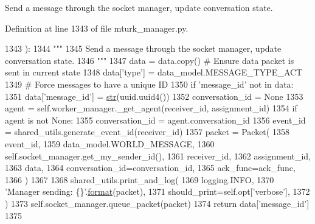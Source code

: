 \begin{DoxyVerb}Send a message through the socket manager, update conversation state.
\end{DoxyVerb}
 

Definition at line 1343 of file mturk\+\_\+manager.\+py.


\begin{DoxyCode}
1343     ):
1344         \textcolor{stringliteral}{"""}
1345 \textcolor{stringliteral}{        Send a message through the socket manager, update conversation state.}
1346 \textcolor{stringliteral}{        """}
1347         data = data.copy()  \textcolor{comment}{# Ensure data packet is sent in current state}
1348         data[\textcolor{stringliteral}{'type'}] = data\_model.MESSAGE\_TYPE\_ACT
1349         \textcolor{comment}{# Force messages to have a unique ID}
1350         \textcolor{keywordflow}{if} \textcolor{stringliteral}{'message\_id'} \textcolor{keywordflow}{not} \textcolor{keywordflow}{in} data:
1351             data[\textcolor{stringliteral}{'message\_id'}] = \hyperlink{namespacegenerate__task__READMEs_a5b88452ffb87b78c8c85ececebafc09f}{str}(uuid.uuid4())
1352         conversation\_id = \textcolor{keywordtype}{None}
1353         agent = self.worker\_manager.\_get\_agent(receiver\_id, assignment\_id)
1354         \textcolor{keywordflow}{if} agent \textcolor{keywordflow}{is} \textcolor{keywordflow}{not} \textcolor{keywordtype}{None}:
1355             conversation\_id = agent.conversation\_id
1356         event\_id = shared\_utils.generate\_event\_id(receiver\_id)
1357         packet = Packet(
1358             event\_id,
1359             data\_model.WORLD\_MESSAGE,
1360             self.socket\_manager.get\_my\_sender\_id(),
1361             receiver\_id,
1362             assignment\_id,
1363             data,
1364             conversation\_id=conversation\_id,
1365             ack\_func=ack\_func,
1366         )
1367 
1368         shared\_utils.print\_and\_log(
1369             logging.INFO,
1370             \textcolor{stringliteral}{'Manager sending: \{\}'}.\hyperlink{namespaceparlai_1_1chat__service_1_1services_1_1messenger_1_1shared__utils_a32e2e2022b824fbaf80c747160b52a76}{format}(packet),
1371             should\_print=self.opt[\textcolor{stringliteral}{'verbose'}],
1372         )
1373         self.socket\_manager.queue\_packet(packet)
1374         \textcolor{keywordflow}{return} data[\textcolor{stringliteral}{'message\_id'}]
1375 
\end{DoxyCode}
\mbox{\label{classparlai_1_1mturk_1_1core_1_1dev_1_1mturk__manager_1_1MTurkManager_ad1ff8e2af7fe866ed623d640f4605090}} 
